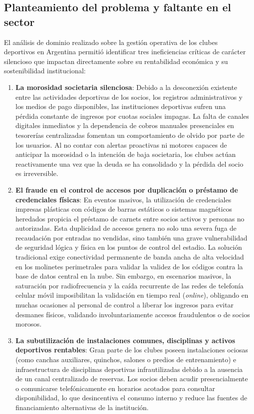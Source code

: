 \subsection{Planteamiento del problema y faltante en el sector}

El análisis de dominio realizado sobre la gestión operativa de los clubes deportivos en Argentina permitió identificar tres ineficiencias críticas de carácter silencioso que impactan directamente sobre su rentabilidad económica y su sostenibilidad institucional:

\begin{enumerate}
    \item \textbf{La morosidad societaria silenciosa}: Debido a la desconexión existente entre las actividades deportivas de los socios, los registros administrativos y los medios de pago disponibles, las instituciones deportivas sufren una pérdida constante de ingresos por cuotas sociales impagas. La falta de canales digitales inmediatos y la dependencia de cobros manuales presenciales en tesorerías centralizadas fomentan un comportamiento de olvido por parte de los usuarios. Al no contar con alertas proactivas ni motores capaces de anticipar la morosidad o la intención de baja societaria, los clubes actúan reactivamente una vez que la deuda se ha consolidado y la pérdida del socio es irreversible.
    \item \textbf{El fraude en el control de accesos por duplicación o préstamo de credenciales físicas}: En eventos masivos, la utilización de credenciales impresas plásticas con códigos de barras estáticos o sistemas magnéticos heredados propicia el préstamo de carnets entre socios activos y personas no autorizadas. Esta duplicidad de accesos genera no solo una severa fuga de recaudación por entradas no vendidas, sino también una grave vulnerabilidad de seguridad lógica y física en los puntos de control del estadio. La solución tradicional exige conectividad permanente de banda ancha de alta velocidad en los molinetes perimetrales para validar la validez de los códigos contra la base de datos central en la nube. Sin embargo, en escenarios masivos, la saturación por radiofrecuencia y la caída recurrente de las redes de telefonía celular móvil imposibilitan la validación en tiempo real (\textit{online}), obligando en muchas ocasiones al personal de control a liberar los ingresos para evitar desmanes físicos, validando involuntariamente accesos fraudulentos o de socios morosos.
    \item \textbf{La subutilización de instalaciones comunes, disciplinas y activos deportivos rentables}: Gran parte de los clubes poseen instalaciones ociosas (como canchas auxiliares, quinchos, salones o predios de entrenamiento) e infraestructura de disciplinas deportivas infrautilizadas debido a la ausencia de un canal centralizado de reservas. Los socios deben acudir presencialmente o comunicarse telefónicamente en horarios acotados para consultar disponibilidad, lo que desincentiva el consumo interno y reduce las fuentes de financiamiento alternativas de la institución.
\end{enumerate}

